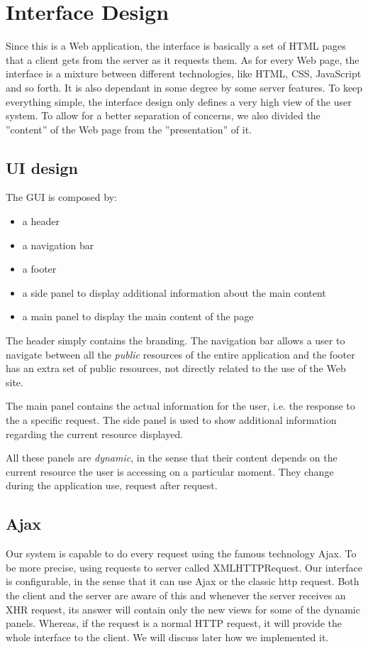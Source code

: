 \section{Interface Design}
Since this is a Web application, the interface is basically a set of HTML pages that a client gets from the server as it requests them. As for every Web page, the interface is a mixture between different technologies, like HTML, CSS, JavaScript and so forth. It is also dependant in some degree by some server features. To keep everything simple, the interface design only defines a very high view of the user system. To allow for a better separation of concerns, we also divided the ''content'' of the Web page from the ''presentation'' of it.
\subsection{UI design}
The GUI is composed by:
\begin{itemize}
\item a header
\item a navigation bar
\item a footer
\item a side panel to display additional information about the main content
\item a main panel to display the main content of the page
\end{itemize}
The header simply contains the branding. The navigation bar allows a user to navigate between all the \emph{public} resources of the entire application and the footer has an extra set of public resources, not directly related to the use of the Web site.

The main panel contains the actual information for the user, i.e. the response to the a specific request. The side panel is used to show additional information regarding the current resource displayed.

All these panels are \emph{dynamic}, in the sense that their content depends on the current resource the user is accessing on a particular moment. They change during the application use, request after request.

\subsection{Ajax}
Our system is capable to do every request using the famous technology Ajax. To be more precise, using requests to server called XMLHTTPRequest. Our interface is configurable, in the sense that it can use Ajax or the classic http request. Both the client and the server are aware of this and whenever the server receives an XHR request, its answer will contain only the new views for some of the dynamic panels. Whereas, if the request is a normal HTTP request, it will provide the whole interface to the client. We will discuss later how we implemented it.

